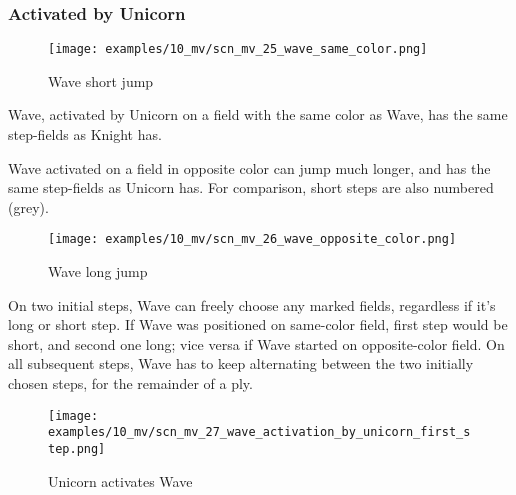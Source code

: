 \subsubsection*{Activated by Unicorn}
\label{sec:Miranda's veil/Wave/Movement/Activated by Unicorn}

\vspace*{-0.7\baselineskip}
\noindent
\begin{wrapfigure}[10]{l}{0.45\textwidth}
\centering
\texttt{[image: examples/10\_mv/scn\_mv\_25\_wave\_same\_color.png]}
\vspace*{-0.3\baselineskip}
\caption{Wave short jump}
\label{fig:scn_mv_25_wave_same_color}
\end{wrapfigure}
Wave, activated by Unicorn on a field with the same color as Wave, has the same step-fields
as Knight has.

Wave activated on a field in opposite color can jump much longer, and has the same step-fields
as Unicorn has. For comparison, short steps are also numbered (grey).

\vspace*{0.7\baselineskip}
\noindent
\begin{wrapfigure}[18]{l}{0.7\textwidth}
\centering
\texttt{[image: examples/10\_mv/scn\_mv\_26\_wave\_opposite\_color.png]}
\vspace*{-0.3\baselineskip}
\caption{Wave long jump}
\label{fig:scn_mv_26_wave_opposite_color}
\end{wrapfigure}
On two initial steps, Wave can freely choose any marked fields, regardless if it's long or short step.
If Wave was positioned on same-color field, first step would be short, and second one long; vice versa
if Wave started on opposite-color field. On all subsequent steps, Wave has to keep alternating between
the two initially chosen steps, for the remainder of a ply.

\clearpage %

\vspace*{-2.1\baselineskip}
\noindent
\begin{figure}[!h]
\texttt{[image: examples/10\_mv/scn\_mv\_27\_wave\_activation\_by\_unicorn\_first\_step.png]}
\vspace*{-1.3\baselineskip}
\caption{Unicorn activates Wave}
\label{fig:scn_mv_27_wave_activation_by_unicorn_first_step}
\end{figure}

